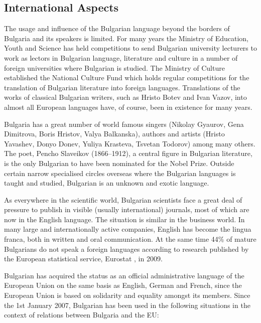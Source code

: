 \begin{multicols}{2}
  \subsection{International Aspects}

  The usage and influence of the Bulgarian language beyond the borders of Bulgaria and its speakers is limited. For many years the Ministry of Education, Youth and Science has held competitions to send Bulgarian university lecturers to work as lectors in Bulgarian language, literature and culture in a number of foreign universities where Bulgarian is studied. The Ministry of Culture established the National Culture Fund which holds regular competitions for the translation of Bulgarian literature into foreign languages. Translations of the works of classical Bulgarian writers, such as Hristo Botev and Ivan Vazov, into almost all European languages have, of course, been in existence for many years. 
  \columnbreak

  Bulgaria has a great number of world famous singers (Nikolay Gyaurov, Gena Dimitrova, Boris Hristov, Valya Balkanska), authors and artists (Hristo Yavashev, Donyo Donev, Yuliya Krasteva, Tsvetan Todorov) among many others. The poet, Pencho Slaveikov (1866--1912), a central figure in Bulgarian literature, is the only Bulgarian to have been nominated for the Nobel Prize. Outside certain narrow specialised circles overseas where the Bulgarian languages is taught and studied, Bulgarian is an unknown and exotic language.


  As everywhere in the scientific world, Bulgarian scientists face a great deal of pressure to publish in visible (usually international) journals, most of which are now in the English language. The situation is similar in the business world. In many large and internationally active companies, English has become the lingua franca, both in written and oral communication. At the same time 44\% of mature Bulgarians do not speak a foreign languages according to research published by the European statistical service, Eurostat \cite{epp}, in 2009. 

  Bulgarian has acquired the status as an official administrative language of the European Union on the same basis as English, German and French, since the European Union is based on solidarity and equality amongst its members. Since the 1st January 2007, Bulgarian has been used in the following situations in the context of relations between Bulgaria and the EU:


\end{multicols}

